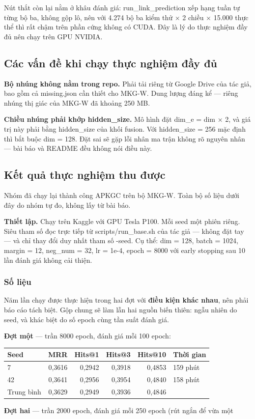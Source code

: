 \documentclass[11pt,a4paper]{article}
\newcommand{\code}[1]{{\ttfamily\small\color{codetext}#1}}
\begin{document}
Nút thắt còn lại nằm ở khâu đánh giá: \code{run\_link\_prediction} xếp hạng tuần tự từng bộ ba, không gộp lô, nên với 4.274 bộ ba kiểm thử $\times$ 2 chiều $\times$ 15.000 thực thể thì rất chậm trên phần cứng không có CUDA. Đây là lý do thực nghiệm đầy đủ nên chạy trên GPU NVIDIA.

\subsection{Các vấn đề khi chạy thực nghiệm đầy đủ}
\textbf{Bộ nhúng không nằm trong repo.} Phải tải riêng từ Google Drive của tác giả, bao gồm cả \code{missing.json} cần thiết cho MKG-W. Dung lượng đáng kể --- riêng nhúng thị giác của MKG-W đã khoảng 250 MB.

\textbf{Chiều nhúng phải khớp \code{hidden\_size}.} Mô hình đặt \code{dim\_e = dim × 2}, và giá trị này phải bằng \code{hidden\_size} của khối fusion. Với \code{hidden\_size = 256} mặc định thì bắt buộc \code{dim = 128}. Đặt sai sẽ gặp lỗi nhân ma trận không rõ nguyên nhân --- bài báo và README đều không nói điều này.

\subsection{Kết quả thực nghiệm thu được}
Nhóm đã chạy lại thành công APKGC trên bộ MKG-W. Toàn bộ số liệu dưới đây do nhóm tự đo, không lấy từ bài báo.

\textbf{Thiết lập.} Chạy trên Kaggle với GPU Tesla P100. Mỗi seed một phiên riêng. Siêu tham số đọc trực tiếp từ \code{scripts/run\_base.sh} của tác giả --- không đặt tay --- và chỉ thay đổi duy nhất tham số \code{-seed}. Cụ thể: \code{dim = 128}, \code{batch = 1024}, \code{margin = 12}, \code{neg\_num = 32}, \code{lr = 1e-4}, \code{epoch = 8000} với early stopping sau 10 lần đánh giá không cải thiện.

\subsubsection{Số liệu}
Năm lần chạy được thực hiện trong hai đợt với \textbf{điều kiện khác nhau}, nên phải báo cáo tách biệt. Gộp chung sẽ làm lẫn hai nguồn biến thiên: ngẫu nhiên do seed, và khác biệt do số epoch cùng tần suất đánh giá.

\textbf{Đợt một} --- trần 8000 epoch, đánh giá mỗi 100 epoch:

\begin{center}\small
\begin{tabular}{@{}lrrrrl@{}}
\toprule
\textbf{Seed} & \textbf{MRR} & \textbf{Hits@1} & \textbf{Hits@3} & \textbf{Hits@10} & \textbf{Thời gian}\\
\midrule
7 & 0,3616 & 0,2942 & 0,3918 & 0,4853 & 159 phút\\
42 & 0,3641 & 0,2956 & 0,3954 & 0,4840 & 158 phút\\
Trung bình & 0,3629 & 0,2949 & 0,3936 & 0,4846 & \\
\bottomrule
\end{tabular}
\end{center}
\textbf{Đợt hai} --- trần 2000 epoch, đánh giá mỗi 250 epoch (rút ngắn để vừa một
\end{document}
